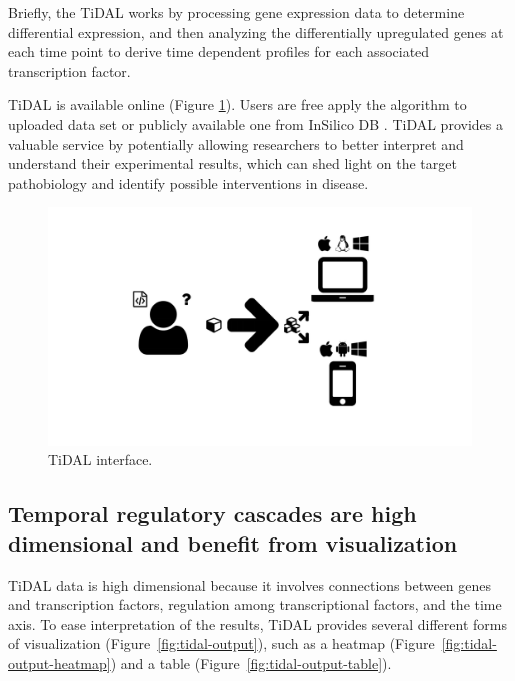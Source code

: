 Briefly, the TiDAL works by processing gene expression data to determine differential expression, and then analyzing the differentially upregulated genes at each time point to derive time dependent profiles for each associated transcription factor.

TiDAL is available online (Figure \ref{fig:tidal-landing}). 
Users are free apply the algorithm to uploaded data set or publicly available one from InSilico DB \autocite{coletta2012insilico}.
TiDAL provides a valuable service by potentially allowing researchers to better interpret and understand their experimental results, which can shed light on the target pathobiology and identify possible interventions in disease.

\begin{figure}
  \centering
  \includegraphics[width=\textwidth,page=17,trim=0.37cm .65cm 0.37cm 0.3cm, clip=true]{images/Figures.pdf}
  \caption{TiDAL interface.}
  \label{fig:tidal-landing}
\end{figure}







\subsection{Temporal regulatory cascades are high dimensional and benefit from visualization}

TiDAL data is high dimensional because it involves connections between genes  and transcription factors, regulation among transcriptional factors, and the time axis.
To ease interpretation of the results, TiDAL provides several different forms of visualization (Figure~\ref{fig:tidal-output}), such as a heatmap (Figure~\ref{fig:tidal-output-heatmap}) and a table (Figure~\ref{fig:tidal-output-table}).

